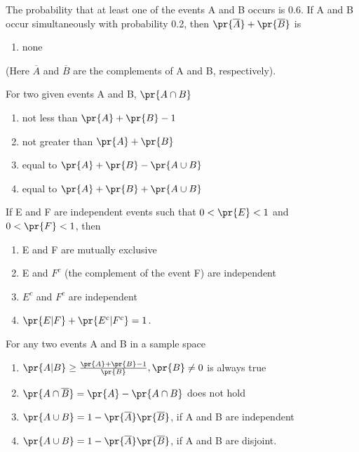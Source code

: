 \iffalse
\title{ASSIGNMENT 3}
\author{EE24BTECH11003 - Akshara Sarma Chennubhatla}
\section{mcq-multiple}
\fi
\item The probability that at least one of the events A and B occurs is 0.6. If A and B occur simultaneously with probability 0.2, then $\pr{\overline{A}}+\pr{\overline{B}}$ is
\hfill{}
\begin{enumerate}
\item none
\end{enumerate}
(Here $\overline{A}$ and $\overline{B}$ are the complements of A and B, respectively).
\item For two given events A and B, $\pr{A \cap B}$
\hfill{}
\begin{enumerate}
\item not less than $\pr{A}+\pr{B}-1$
\item not greater than $\pr{A}+\pr{B}$
\item equal to $\pr{A}+\pr{B}-\pr{A \cup B}$
\item equal to $\pr{A}+\pr{B}+\pr{A \cup B}$
\end{enumerate}
\item If E and F are independent events such that $0<\pr{E}<1$ and $0<\pr{F}<1$, then 
\hfill{}
\begin{enumerate}
\item E and F are mutually exclusive
\item E and $F^c$ (the complement of the event F) are independent
\item $E^c$ and $F^c$ are independent
\item $\pr{E|F}+\pr{E^c|F^c}=1$.
\end{enumerate}
\item For any two events A and B in a sample space
\hfill{}
\begin{enumerate}
\item $\pr{A|B}\geq \frac{\pr{A}+\pr{B}-1}{\pr{B}}, \pr{B}\neq 0$ is always true
\item $\pr{A\cap \overline{B}}=\pr{A}-\pr{A\cap B}$ does not hold
\item $\pr{A\cup B}=1-\pr{\overline{A}}\pr{\overline{B}}$, if A and B are independent
\item $\pr{A\cup B}=1-\pr{\overline{A}}\pr{\overline{B}}$, if A and B are disjoint.
\end{enumerate}
